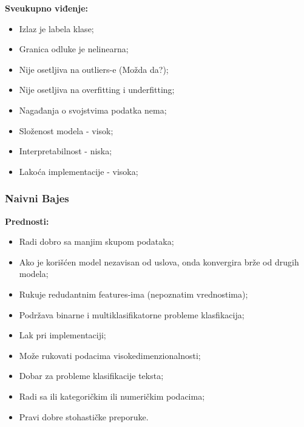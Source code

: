 \documentclass[fontsize=12bp, paper=a4]{scrarticle}
\begin{document}
\textbf{Sveukupno viđenje:}
\begin{itemize}
    \item Izlaz je labela klase;
    \item Granica odluke je nelinearna;
    \item Nije osetljiva na outliers-e (Možda da?);
    \item Nije osetljiva na overfitting i underfitting;
    \item Nagađanja o svojstvima podatka nema;
    \item Složenost modela - visok;
    \item Interpretabilnost - niska;
    \item Lakoća implementacije - visoka;
\end{itemize}


\subsubsection{Naivni Bajes}




\textbf{Prednosti:}
\begin{itemize}
    \item Radi dobro sa manjim skupom podataka;
    \item Ako je korišćen model nezavisan od uslova, onda konvergira brže od drugih modela;
    \item Rukuje redudantnim features-ima (nepoznatim vrednostima);
    \item Podržava binarne i multiklasifikatorne probleme klasfikacija;
    \item Lak pri implementaciji;
    \item Može rukovati podacima visokedimenzionalnosti;
    \item Dobar za probleme klasifikacije teksta;
    \item Radi sa ili kategoričkim ili numeričkim podacima;
    \item Pravi dobre stohastičke preporuke.
\end{itemize}
\end{document}
